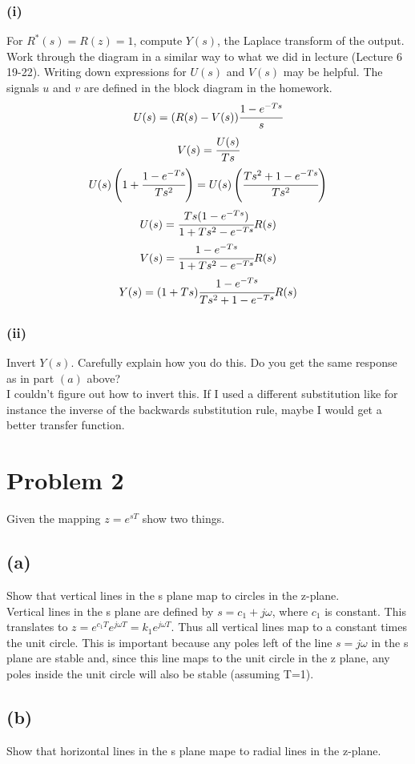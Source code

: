 \documentclass{article}
\begin{document}
\subsubsection*{(i)}
For $R^*(s)=R(z)=1$, compute $Y(s)$, the Laplace transform of the output. Work through the diagram in a similar way to what we did in lecture (Lecture 6 19-22). Writing down expressions for $U(s)$ and $V(s)$ may be helpful. The signals $u$ and $v$ are defined in the block diagram in the homework.\\

\[U(s)=(R(s)-V(s))\cfrac{1-e^{-Ts}}{s}\]
\[V(s)=\cfrac{U(s)}{Ts}\]
\[U(s)\left (1+\cfrac{1-e^{-Ts}}{Ts^2}\right )=U(s)\left (\cfrac{Ts^2+1-e^{-Ts}}{Ts^2}\right )\]
\[U(s)=\cfrac{Ts(1-e^{-Ts})}{1+Ts^2-e^{-Ts}}R(s)\]
\[V(s)=\cfrac{1-e^{-Ts}}{1+Ts^2-e^{-Ts}}R(s)\]
\[Y(s)=(1+Ts)\cfrac{1-e^{-Ts}}{Ts^2+1-e^{-Ts}}R(s)\]

\subsubsection*{(ii)}
Invert $Y(s)$. Carefully explain how you do this. Do you get the same response as in part $(a)$ above?\\

I couldn't figure out how to invert this. If I used a different substitution like for instance the inverse of the backwards substitution rule, maybe I would get a better transfer function.


\section*{Problem 2}
Given the mapping $z=e^{sT}$ show two things.
\subsection*{(a)}
Show that vertical lines in the s plane map to circles in the z-plane.\\

Vertical lines in the s plane are defined by $s=c_1+j\omega$, where $c_1$ is constant. This translates to $z=e^{c_1T}e^{j\omega T}=k_1e^{j\omega T}$. Thus all vertical lines map to a constant times the unit circle. This is important because any poles left of the line $s=j\omega$ in the s plane are stable and, since this line maps to the unit circle in the z plane, any poles inside the unit circle will also be stable (assuming T=1).
\subsection*{(b)}
Show that horizontal lines in the s plane mape to radial lines in the z-plane.\\
\end{document}
